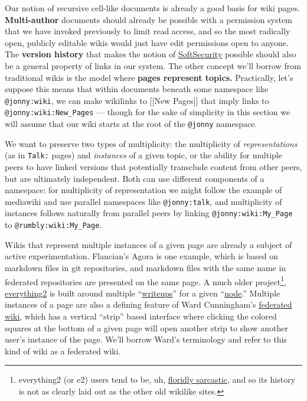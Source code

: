 Our notion of recursive cell-like documents is already a good basis for
wiki pages. \textbf{Multi-author} documents should already be possible
with a permission system that we have invoked previously to limit read
access, and so the most radically open, publicly editable wikis would
just have edit permissions open to anyone. The \textbf{version history}
that makes the notion of
\href{http://meatballwiki.org/wiki/SoftSecurity}{SoftSecurity} possible
should also be a general property of links in our system. The other
concept we'll borrow from traditional wikis is the model where
\textbf{pages represent topics.} Practically, let's suppose this means
that within documents beneath some namespace like \texttt{@jonny:wiki},
we can make wikilinks to {[}{[}New Pages{]}{]} that imply links to
\texttt{@jonny:wiki:New\_Pages} --- though for the sake of simplicity in
this section we will assume that our wiki starts at the root of the
\texttt{@jonny} namespace.

We want to preserve two types of multiplicity: the multiplicity of
\emph{representations} (as in \texttt{Talk:} pages) and \emph{instances}
of a given topic, or the ability for multiple peers to have linked
versions that potentially transclude content from other peers, but are
ultimately independent. Both can use different components of a
namespace: for multiplicity of representation we might follow the
example of mediawiki and use parallel namespaces like
\texttt{@jonny:talk}, and multiplicity of instances follows naturally
from parallel peers by linking \texttt{@jonny:wiki:My\_Page} to
\texttt{@rumbly:wiki:My\_Page}.

Wikis that represent multiple instances of a given page are already a
subject of active experimentation. Flancian's Agora is one example,
which is based on markdown files in git repositories, and markdown files
with the same name in federated repositories are presented on the same
page. A much older project\footnote{everything2 (or e2) users tend to
  be, uh,
  \href{https://everything2.com/title/Everything\%253A+In+the+Beginning}{floridly
  sarcastic}, and so its history is not as clearly laid out as the other
  old wikilike sites.}, \href{https://everything2.com/}{everything2} is
built around multiple
``\href{https://everything2.com/title/Writeup}{writeups}'' for a given
``\href{https://everything2.com/title/Node}{node}.'' Multiple instances
of a page are also a defining feature of Ward Cunningham's
\href{http://ward.fed.wiki.org/view/welcome-visitors/view/home-in-the-federation}{federated
wiki}, which has a vertical ``strip'' based interface where clicking the
colored squares at the bottom of a given page will open another strip to
show another user's instance of the page. We'll borrow Ward's
terminology and refer to this kind of wiki as a federated wiki.

